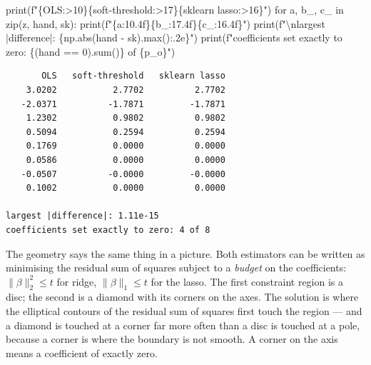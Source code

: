 \documentclass[
  letterpaper,
  10pt,
  twoside,
  openright,
  numbers=noenddot,
  chapterprefix=true]{scrbook}
\newenvironment{Shaded}{}{}
\newcommand{\BuiltInTok}[1]{\textcolor[rgb]{0.84,0.23,0.29}{#1}}
\newcommand{\CharTok}[1]{\textcolor[rgb]{0.01,0.18,0.38}{#1}}
\newcommand{\ControlFlowTok}[1]{\textcolor[rgb]{0.84,0.23,0.29}{#1}}
\newcommand{\DecValTok}[1]{\textcolor[rgb]{0.00,0.36,0.77}{#1}}
\newcommand{\KeywordTok}[1]{\textcolor[rgb]{0.84,0.23,0.29}{#1}}
\newcommand{\NormalTok}[1]{\textcolor[rgb]{0.14,0.16,0.18}{#1}}
\newcommand{\OperatorTok}[1]{\textcolor[rgb]{0.14,0.16,0.18}{#1}}
\newcommand{\SpecialCharTok}[1]{\textcolor[rgb]{0.00,0.36,0.77}{#1}}
\newcommand{\SpecialStringTok}[1]{\textcolor[rgb]{0.01,0.18,0.38}{#1}}
\newcommand{\StringTok}[1]{\textcolor[rgb]{0.01,0.18,0.38}{#1}}
\begin{document}
\begin{Shaded}
\begin{Highlighting}[]
\BuiltInTok{print}\NormalTok{(}\SpecialStringTok{f"}\SpecialCharTok{\{}\StringTok{\textquotesingle{}OLS\textquotesingle{}}\SpecialCharTok{:\textgreater{}10\}\{}\StringTok{\textquotesingle{}soft{-}threshold\textquotesingle{}}\SpecialCharTok{:\textgreater{}17\}\{}\StringTok{\textquotesingle{}sklearn lasso\textquotesingle{}}\SpecialCharTok{:\textgreater{}16\}}\SpecialStringTok{"}\NormalTok{)}
\ControlFlowTok{for}\NormalTok{ a, b\_, c\_ }\KeywordTok{in} \BuiltInTok{zip}\NormalTok{(z, hand, sk):}
    \BuiltInTok{print}\NormalTok{(}\SpecialStringTok{f"}\SpecialCharTok{\{}\NormalTok{a}\SpecialCharTok{:10.4f\}\{}\NormalTok{b\_}\SpecialCharTok{:17.4f\}\{}\NormalTok{c\_}\SpecialCharTok{:16.4f\}}\SpecialStringTok{"}\NormalTok{)}
\BuiltInTok{print}\NormalTok{(}\SpecialStringTok{f"}\CharTok{\textbackslash{}n}\SpecialStringTok{largest |difference|: }\SpecialCharTok{\{}\NormalTok{np}\SpecialCharTok{.}\BuiltInTok{abs}\NormalTok{(hand }\OperatorTok{{-}}\NormalTok{ sk)}\SpecialCharTok{.}\BuiltInTok{max}\NormalTok{()}\SpecialCharTok{:.2e\}}\SpecialStringTok{"}\NormalTok{)}
\BuiltInTok{print}\NormalTok{(}\SpecialStringTok{f"coefficients set exactly to zero: }\SpecialCharTok{\{}\NormalTok{(hand }\OperatorTok{==} \DecValTok{0}\NormalTok{)}\SpecialCharTok{.}\BuiltInTok{sum}\NormalTok{()}\SpecialCharTok{\}}\SpecialStringTok{ of }\SpecialCharTok{\{}\NormalTok{p\_o}\SpecialCharTok{\}}\SpecialStringTok{"}\NormalTok{)}
\end{Highlighting}
\end{Shaded}

\begin{verbatim}
       OLS   soft-threshold   sklearn lasso
    3.0202           2.7702          2.7702
   -2.0371          -1.7871         -1.7871
    1.2302           0.9802          0.9802
    0.5094           0.2594          0.2594
    0.1769           0.0000          0.0000
    0.0586           0.0000          0.0000
   -0.0507          -0.0000         -0.0000
    0.1002           0.0000          0.0000

largest |difference|: 1.11e-15
coefficients set exactly to zero: 4 of 8
\end{verbatim}

The geometry says the same thing in a picture. Both estimators can be
written as minimising the residual sum of squares subject to a
\emph{budget} on the coefficients: \(\lVert\beta\rVert_2^2 \le t\) for
ridge, \(\lVert\beta\rVert_1 \le t\) for the lasso. The first constraint
region is a disc; the second is a diamond with its corners on the axes.
The solution is where the elliptical contours of the residual sum of
squares first touch the region --- and a diamond is touched at a corner
far more often than a disc is touched at a pole, because a corner is
where the boundary is not smooth. A corner on the axis means a
coefficient of exactly zero.
\end{document}
